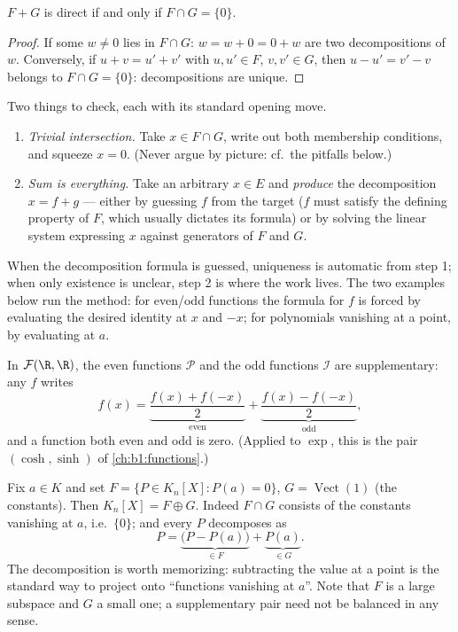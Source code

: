 \begin{proposition}\label{prop:b1:vspaces:directsum}
$F + G$ is direct if and only if $F \cap G = \{0\}$.
\end{proposition}

\begin{proof}
If some $w \neq 0$ lies in $F \cap G$: $w = w + 0 = 0 + w$ are two
decompositions of $w$. Conversely, if $u + v = u' + v'$ with $u, u'
\in F$, $v, v' \in G$, then $u - u' = v' - v$ belongs to $F \cap G =
\{0\}$: decompositions are unique.
\end{proof}

\begin{method}[Proving $E = F \oplus G$]
\label{met:b1:vspaces:directsum}
Two things to check, each with its standard opening move.
\begin{enumerate}
  \item \emph{Trivial intersection.} Take $x \in F \cap G$,
        write out both membership conditions, and squeeze $x =
        0$. (Never argue by picture: cf.\ the pitfalls below.)
  \item \emph{Sum is everything.} Take an arbitrary $x \in E$
        and \emph{produce} the decomposition $x = f + g$ ---
        either by guessing $f$ from the target ($f$ must satisfy
        the defining property of $F$, which usually dictates its
        formula) or by solving the linear system expressing $x$
        against generators of $F$ and $G$.
\end{enumerate}
When the decomposition formula is guessed, uniqueness is
automatic from step 1; when only existence is unclear, step 2 is
where the work lives. The two examples below run the method: for
even/odd functions the formula for $f$ is forced by evaluating
the desired identity at $x$ and $-x$; for polynomials vanishing
at a point, by evaluating at $a$.
\end{method}

\begin{example}\label{ex:b1:vspaces:evenodd}
In $\mathcal{F}(\R, \R)$, the even functions $\mathcal{P}$ and the
odd functions $\mathcal{I}$ are supplementary: any $f$ writes
\[
f(x) = \underbrace{\frac{f(x) + f(-x)}{2}}_{\text{even}}
+ \underbrace{\frac{f(x) - f(-x)}{2}}_{\text{odd}},
\]
and a function both even and odd is zero. (Applied to $\exp$, this
is the pair $(\cosh, \sinh)$ of \cref{ch:b1:functions}.)
\end{example}

\begin{example}
\label{ex:b1:vspaces:hyperplane}
Fix $a \in K$ and set $F = \{P \in K_n[X] : P(a) = 0\}$, $G =
\operatorname{Vect}(1)$ (the constants). Then $K_n[X] = F \oplus
G$. Indeed $F \cap G$ consists of the constants vanishing at $a$,
i.e.\ $\{0\}$; and every $P$ decomposes as
\[
P = \underbrace{\bigl(P - P(a)\bigr)}_{\in F}
+ \underbrace{P(a)}_{\in G} .
\]
The decomposition is worth memorizing: subtracting the value at a
point is the standard way to project onto ``functions vanishing at
$a$''. Note that $F$ is a large subspace and $G$ a small one; a
supplementary pair need not be balanced in any sense.
\end{example}

